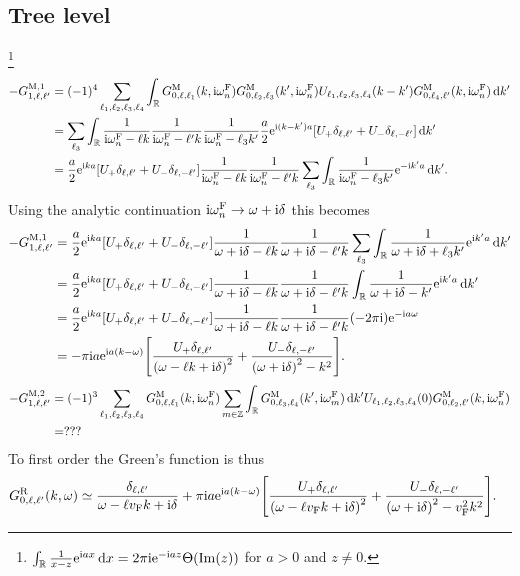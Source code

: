 \documentclass[english, parskip=full]{scrartcl}
\begin{document}
\subsection{Tree level}
\footnote{$\int_{\mathbb{R}} \frac{1}{x-z} \text{e}^{\text{i} a x} \, \mathrm{d}x = 2\pi\text{i} \text{e}^{-\text{i} a z} \Theta(\Im(z))$ for $a>0$ and $z\neq 0$.}
\begin{align}
-G_{1,\ell,\ell'}^{\M,1} &= (-1)^4 \sum_{\ell_1,\ell_2,\ell_3,\ell_4} \intr{G_{0,\ell,\ell_1}^\M(k,\i\omega_n^\F) G_{0,\ell_2,\ell_3}^\M(k',\i\omega_n^\F) U_{\ell_1,\ell_2,\ell_3,\ell_4}(k-k') G_{0,\ell_4,\ell'}^\M(k,\i\omega_n^\F)}{k'}\\
&= \sum_{\ell_3} \intr{\frac{1}{\i\omega_n^\F - \ell k} \frac{1}{\i\omega_n^\F - \ell' k} \frac{1}{\i\omega_n^\F - \ell_3 k'} \frac{a}{2} \powe{\i (k-k')a} \klb*{U_+\delta_{\ell,\ell'} + U_-\delta_{\ell,-\ell'}}}{k'}\\
&= \frac{a}{2}\powe{\i ka} \klb*{U_+\delta_{\ell,\ell'} + U_-\delta_{\ell,-\ell'}} \frac{1}{\i\omega_n^\F - \ell k} \frac{1}{\i\omega_n^\F - \ell' k} \sum_{\ell_3} \intr{\frac{1}{\i\omega_n^\F - \ell_3 k'} \powe{-\i k'a}}{k'}.
\end{align}
Using the analytic continuation $\text{i}\omega_n^{\text{F}}\rightarrow \omega + \text{i}\delta$ this becomes
\begin{align}
-G_{1,\ell,\ell'}^{\M,1} &= \frac{a}{2}\powe{\i ka} \klb*{U_+\delta_{\ell,\ell'} + U_-\delta_{\ell,-\ell'}} \frac{1}{\omega + \i\delta - \ell k} \frac{1}{\omega + \i\delta - \ell' k} \sum_{\ell_3} \intr{\frac{1}{\omega + \i\delta + \ell_3 k'} \powe{\i k'a}}{k'}\\
&= \frac{a}{2}\powe{\i ka} \klb*{U_+\delta_{\ell,\ell'} + U_-\delta_{\ell,-\ell'}} \frac{1}{\omega + \i\delta - \ell k} \frac{1}{\omega + \i\delta - \ell' k} \intr{\frac{1}{\omega + \i\delta - k'} \powe{\i k'a}}{k'}\\
&= \frac{a}{2}\powe{\i ka} \klb*{U_+\delta_{\ell,\ell'} + U_-\delta_{\ell,-\ell'}} \frac{1}{\omega + \i\delta - \ell k} \frac{1}{\omega + \i\delta - \ell' k} (- 2\pi\i) \powe{-\i a\omega}\\
&= -\pi\i a \powe{\i a(k-\omega)} \klb*{ \frac{U_+\delta_{\ell,\ell'}}{\kla*{\omega - \ell k + \i\delta}^2} + \frac{U_-\delta_{\ell,-\ell'}}{ \kla*{\omega + \i\delta}^2 - k^2 } }.
\end{align}
\begin{align}
-G_{1,\ell,\ell'}^{\text{M},2} &= (-1)^3 \sum_{\ell_1,\ell_2,\ell_3,\ell_4} G_{0,\ell,\ell_1}^{\text{M}}(k,\text{i}\omega_n^{\text{F}}) \sum_{m\in\mathbb{Z}} \int_{\mathbb{R}} G_{0,\ell_3,\ell_4}^{\text{M}}(k',\text{i}\omega_m^{\text{F}}) \, \mathrm{d}k' U_{\ell_1,\ell_2,\ell_3,\ell_4}(0) G_{0,\ell_2,\ell'}^{\text{M}}(k,\text{i}\omega_n^{\text{F}})\\
&= ??? 
\end{align}
To first order the Green's function is thus
\begin{align}
G_{0,\ell,\ell'}^\R(k,\omega) &\simeq \frac{\delta_{\ell,\ell'}}{\omega - \ell \vf k + \i\delta} + \pi\i a \powe{\i a(k-\omega)} \klb*{ \frac{U_+\delta_{\ell,\ell'}}{\kla*{\omega - \ell \vf k + \i\delta}^2} + \frac{U_-\delta_{\ell,-\ell'}}{ \kla*{\omega + \i\delta}^2 - \vf^2 k^2 } }.
\end{align}


\end{document}
